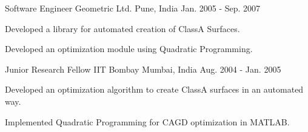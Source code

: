 \begin{cventries}
  \cventry
    {Software Engineer} %
    {Geometric Ltd.} %
    {Pune, India} %
    {Jan. 2005 - Sep. 2007} %
    {
      \begin{cvitems} %
        \item {Developed a library for automated creation of ClassA Surfaces.}
        \item {Developed an optimization module using Quadratic Programming.} 
      \end{cvitems}
    }

  \cventry
    {Junior Research Fellow} %
    {IIT Bombay} %
    {Mumbai, India} %
    {Aug. 2004 - Jan. 2005} %
    {
      \begin{cvitems} %
        \item {Developed an optimization algorithm to create ClassA surfaces in an automated way.}
        \item {Implemented Quadratic Programming for CAGD optimization in MATLAB.}
      \end{cvitems}
    }
\end{cventries}
